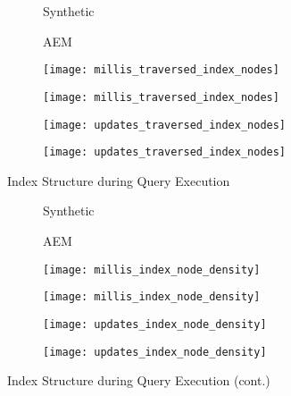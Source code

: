 \documentclass[abstracton,12pt]{scrartcl}
\theoremstyle{definition}
\begin{document}
\begin{figure}[h]
  \centering
  \begin{subfigure}{0.49\linewidth}
    \centering
    Synthetic
  \end{subfigure}
  \begin{subfigure}{0.49\linewidth}
    \centering
    AEM
  \end{subfigure}
  \begin{subfigure}{0.49\linewidth}
    \centering
    \texttt{[image: millis\_traversed\_index\_nodes]}
    \caption{}
    \label{fig:trav_nodes_synthetic_millis}
  \end{subfigure}
  \begin{subfigure}{0.49\linewidth}
    \centering
    \texttt{[image: millis\_traversed\_index\_nodes]} 
    \caption{}
    \label{fig:trav_nodes_aem_millis}
  \end{subfigure}
  \begin{subfigure}{0.49\linewidth}
    \centering
    \texttt{[image: updates\_traversed\_index\_nodes]}
    \caption{}
    \label{fig:trav_nodes_synthetic_updates}
  \end{subfigure}
  \begin{subfigure}{0.49\linewidth}
    \centering
    \texttt{[image: updates\_traversed\_index\_nodes]}
    \caption{}
    \label{fig:trav_nodes_aem_updates}
  \end{subfigure}
  \caption{Index Structure during Query Execution}
\end{figure}

\begin{figure}[h]\ContinuedFloat{}
  \centering
  \begin{subfigure}{0.49\linewidth}
    \centering
    Synthetic
  \end{subfigure}
  \begin{subfigure}{0.49\linewidth}
    \centering
    AEM
  \end{subfigure}
  \begin{subfigure}{0.49\linewidth}
    \centering
    \texttt{[image: millis\_index\_node\_density]}
    \caption{}
    \label{fig:trav_node_density_synthetic_millis}
  \end{subfigure}
  \begin{subfigure}{0.49\linewidth}
    \centering
    \texttt{[image: millis\_index\_node\_density]} 
    \caption{}
    \label{fig:trav_node_density_aem_millis}
  \end{subfigure}
  \begin{subfigure}{0.49\linewidth}
    \centering
    \texttt{[image: updates\_index\_node\_density]}
    \caption{}
    \label{fig:trav_node_density_synthetic_updates}
  \end{subfigure}
  \begin{subfigure}{0.49\linewidth}
    \centering
    \texttt{[image: updates\_index\_node\_density]}
    \caption{}
    \label{fig:trav_node_density_aem_updates}
  \end{subfigure}
 \caption{Index Structure during Query Execution (cont.)}
\end{figure}
\end{document}

